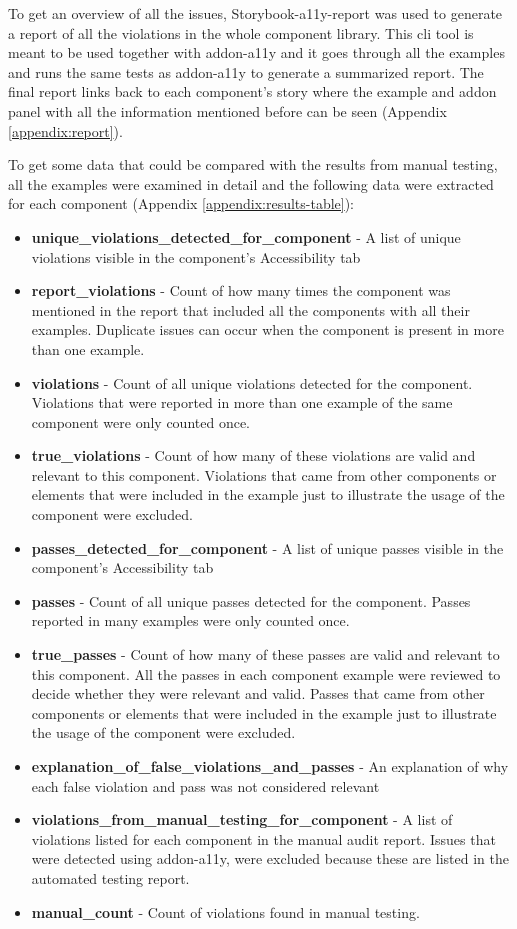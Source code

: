 \documentclass{master_thesis}
\begin{document}
To get an overview of all the issues, Storybook-a11y-report \citep{Karube2020} was used to generate a report of all the violations in the whole component library. This \ac{cli} tool is meant to be used together with addon-a11y and it goes through all the examples and runs the same tests as addon-a11y to generate a summarized report. The final report links back to each component's story where the example and addon panel with all the information mentioned before can be seen (Appendix \ref{appendix:report}).

To get some data that could be compared with the results from manual testing, all the examples were examined in detail and the following data were extracted for each component (Appendix \ref{appendix:results-table}):
\begin{itemize}
	\item \textbf{unique\_violations\_detected\_for\_component} - A list of unique violations visible in the component's Accessibility tab
	\item \textbf{report\_violations} - Count of how many times the component was mentioned in the report that included all the components with all their examples. Duplicate issues can occur when the component is present in more than one example.
	\item \textbf{violations} - Count of all unique violations detected for the component. Violations that were reported in more than one example of the same component were only counted once.
	\item \textbf{true\_violations} - Count of how many of these violations are valid and relevant to this component. Violations that came from other components or elements that were included in the example just to illustrate the usage of the component were excluded.
	\item \textbf{passes\_detected\_for\_component} - A list of unique passes visible in the component's Accessibility tab
	\item \textbf{passes} - Count of all unique passes detected for the component. Passes reported in many examples were only counted once.
	\item \textbf{true\_passes} - Count of how many of these passes are valid and relevant to this component. All the passes in each component example were reviewed to decide whether they were relevant and valid. Passes that came from other components or elements that were included in the example just to illustrate the usage of the component were excluded.
	\item \textbf{explanation\_of\_false\_violations\_and\_passes} - An explanation of why each false violation and pass was not considered relevant
	\item \textbf{violations\_from\_manual\_testing\_for\_component} - A list of violations listed for each component in the manual audit report. Issues that were detected using addon-a11y, were excluded because these are listed in the automated testing report.
	\item \textbf{manual\_count} - Count of violations found in manual testing.
\end{itemize}
\end{document}
